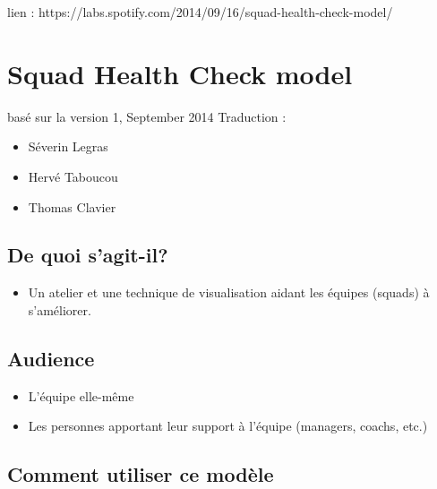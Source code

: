 
lien : https://labs.spotify.com/2014/09/16/squad-health-check-model/


\section{Squad Health Check model}

basé sur la version 1, September 2014
Traduction :
\begin{itemize}
\item Séverin Legras
\item Hervé Taboucou
\item Thomas Clavier
\end{itemize}

\subsection{De quoi s'agit-il?}

\begin{itemize}
\item Un atelier et une technique de visualisation aidant les équipes (squads) à s'améliorer.
\end{itemize}

\subsection{Audience}

\begin{itemize}
\item L'équipe elle-même
\item Les personnes apportant leur support à l'équipe (managers, coachs, etc.)
\end{itemize}

\subsection{Comment utiliser ce modèle}

